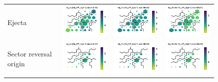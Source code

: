 \documentclass[border=0pt,varwidth=20cm,convert={outext=.jpg,density=300}]{standalone}%
\begin{document}
\begin{figure}[h!]
\begin{tabular}{m{2.5cm}CCC}
		Ejecta & \includegraphics[width=4cm]{Roberts/SWtype-Xu_SW_type-2-log_Sp} &
		\includegraphics[width=4cm]{Roberts/SWtype-Xu_SW_type-2-log_Va} &
		\includegraphics[width=4cm]{Roberts/SWtype-Xu_SW_type-2-log_Tratio} \hfill	\\
		
		Sector reversal origin & \includegraphics[width=4cm]{Roberts/SWtype-Xu_SW_type-3-log_Sp} &
		\includegraphics[width=4cm]{Roberts/SWtype-Xu_SW_type-3-log_Va} &
		\includegraphics[width=4cm]{Roberts/SWtype-Xu_SW_type-3-log_Tratio} \hfill	\\
	\end{tabular}
\end{figure}
\end{document}
